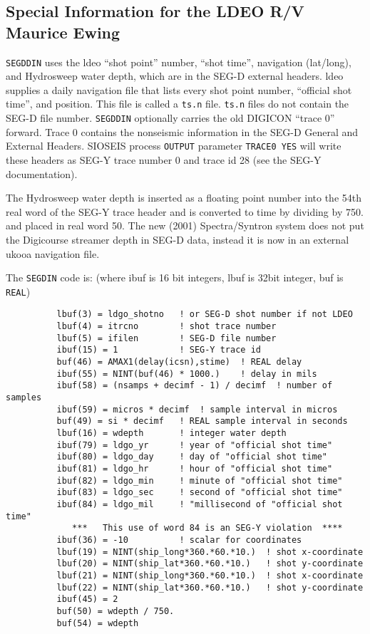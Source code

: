 \subsection{Special Information for the LDEO R/V Maurice Ewing}

     \texttt{SEGDDIN} uses the \gls{ldeo} ``shot point'' number, ``shot time'',
navigation (lat/long), and Hydrosweep water depth, which are in the
SEG-D external headers.
     \gls{ldeo} supplies a daily navigation file that lists every \gls{shot}
point number, ``official shot time'', and position.  This file is
called a \texttt{ts.n} file.  \texttt{ts.n} files do not contain the SEG-D file
number.
     \texttt{SEGDDIN} optionally carries the old DIGICON ``trace 0'' forward.
Trace 0 contains the nonseismic information in the SEG-D General
and External Headers.  SIOSEIS process \texttt{OUTPUT} parameter
\texttt{TRACE0 YES} will write these headers as SEG-Y trace number 0 and
trace id 28 (see the SEG-Y documentation).

     The Hydrosweep water depth is inserted as a floating point
number into the 54th real word of the SEG-Y trace header and is
converted to time by dividing by 750. and placed in real word 50.
The new (2001) Spectra/Syntron system does not put the Digicourse
streamer depth in SEG-D data, instead it is now in an external
\gls{ukooa} navigation file.

     The \texttt{SEGDIN} code is:
(where ibuf is 16 bit integers, lbuf is 32bit integer, buf is \texttt{REAL})

\begin{verbatim}
          lbuf(3) = ldgo_shotno   ! or SEG-D shot number if not LDEO
          lbuf(4) = itrcno        ! shot trace number
          lbuf(5) = ifilen        ! SEG-D file number
          ibuf(15) = 1            ! SEG-Y trace id
          buf(46) = AMAX1(delay(icsn),stime)  ! REAL delay
          ibuf(55) = NINT(buf(46) * 1000.)    ! delay in mils
          ibuf(58) = (nsamps + decimf - 1) / decimf  ! number of samples
          ibuf(59) = micros * decimf  ! sample interval in micros
          buf(49) = si * decimf   ! REAL sample interval in seconds
          lbuf(16) = wdepth       ! integer water depth
          ibuf(79) = ldgo_yr      ! year of "official shot time"
          ibuf(80) = ldgo_day     ! day of "official shot time"
          ibuf(81) = ldgo_hr      ! hour of "official shot time"
          ibuf(82) = ldgo_min     ! minute of "official shot time"
          ibuf(83) = ldgo_sec     ! second of "official shot time"
          ibuf(84) = ldgo_mil     ! "millisecond of "official shot time"
             ***   This use of word 84 is an SEG-Y violation  ****
          ibuf(36) = -10          ! scalar for coordinates
          lbuf(19) = NINT(ship_long*360.*60.*10.)  ! shot x-coordinate
          lbuf(20) = NINT(ship_lat*360.*60.*10.)   ! shot y-coordinate
          lbuf(21) = NINT(ship_long*360.*60.*10.)  ! shot x-coordinate
          lbuf(22) = NINT(ship_lat*360.*60.*10.)   ! shot y-coordinate
          ibuf(45) = 2
          buf(50) = wdepth / 750.
          buf(54) = wdepth
\end{verbatim}

